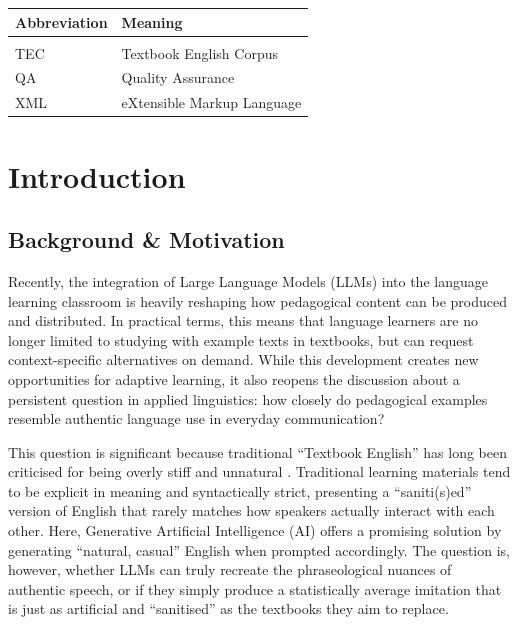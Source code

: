 \documentclass[11pt,a4paper]{article}
\begin{document}
\begin{center}
\renewcommand{\arraystretch}{1.15}
\begin{tabular}{@{}ll@{}}
\toprule
\textbf{Abbreviation} & \textbf{Meaning} \\
\midrule
\phantom{IDIOMATIC} & \phantom{Common European Framework of Reference for Languages} \\[-\normalbaselineskip]
TEC & Textbook English Corpus \\
QA & Quality Assurance \\
XML & eXtensible Markup Language \\
\bottomrule
\end{tabular}
\end{center}

\newpage

\hypersetup{pageanchor=true}

\section{Introduction}\label{sec:introduction}

\subsection{Background \& Motivation}

Recently, the integration of Large Language Models (LLMs) into the language learning classroom is heavily reshaping how pedagogical content can be produced and distributed. In practical terms, this means that language learners are no longer limited to studying with example texts in textbooks, but can request context-specific alternatives on demand. While this development creates new opportunities for adaptive learning, it also reopens the discussion about a persistent question in applied linguistics: how closely do pedagogical examples resemble authentic language use in everyday communication?

This question is significant because traditional ``Textbook English'' has long been criticised for being overly stiff and unnatural \parencite{conti2016ugly}. Traditional learning materials tend to be explicit in meaning and syntactically strict, presenting a ``saniti(s)ed'' \parencite[13]{curdt-christiansenLanguageIdeologyEducation2015} version of English that rarely matches how speakers actually interact with each other. Here, Generative Artificial Intelligence (AI) offers a promising solution by generating ``natural, casual'' English when prompted accordingly. The question is, however, whether LLMs can truly recreate the phraseological nuances of authentic speech, or if they simply produce a statistically average imitation that is just as artificial and ``sanitised'' as the textbooks they aim to replace.
\end{document}
